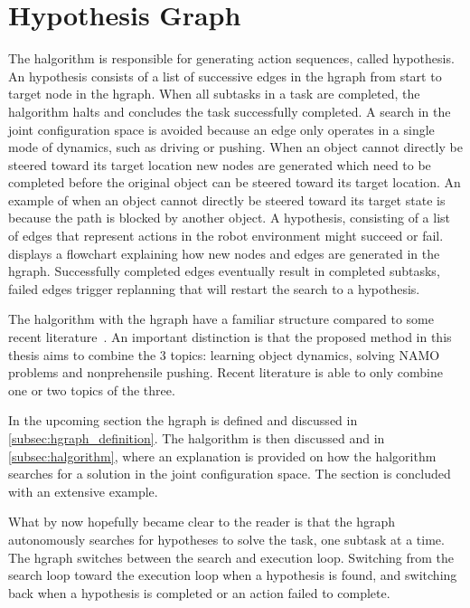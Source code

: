 \section{Hypothesis Graph}%
\label{sec:hgraph}
The \ac{halgorithm} is responsible for generating action sequences, called hypothesis. An hypothesis consists of a list of successive edges in the \ac{hgraph} from start to target node in the \ac{hgraph}. When all subtasks in a task are completed, the \acf{halgorithm} halts and concludes the task successfully completed. A search in the joint configuration space is avoided because an edge only operates in a single mode of dynamics, such as driving or pushing. When an object cannot directly be steered toward its target location new nodes are generated which need to be completed before the original object can be steered toward its target location. An example of when an object cannot directly be steered toward its target state is because the path is blocked by another object. A hypothesis, consisting of a list of edges that represent actions in the robot environment might succeed or fail.  displays a flowchart explaining how new nodes and edges are generated in the \ac{hgraph}. Successfully completed edges eventually result in completed subtasks, failed edges trigger replanning that will restart the search to a hypothesis.\bs

The \ac{halgorithm} with the \ac{hgraph} have a familiar structure compared to some recent literature~\cite{ellis_navigation_2022,wang_affordancebased_2020}. An important distinction is that the proposed method in this thesis aims to combine the 3 topics: learning object dynamics, solving \ac{NAMO} problems and nonprehensile pushing. Recent literature is able to only combine one or two topics of the three.\bs

In the upcoming section the \ac{hgraph} is defined and discussed in \cref{subsec:hgraph_definition}. The \ac{halgorithm} is then discussed and in \cref{subsec:halgorithm}, where an explanation is provided on how the \ac{halgorithm} searches for a solution in the joint configuration space. The section is concluded with an extensive example.\bs





What by now hopefully became clear to the reader is that the \ac{hgraph} autonomously searches for hypotheses to solve the task, one subtask at a time. The \ac{hgraph} switches between the search and execution loop. Switching from the search loop toward the execution loop when a hypothesis is found, and switching back when a hypothesis is completed or an action failed to complete.\bs

